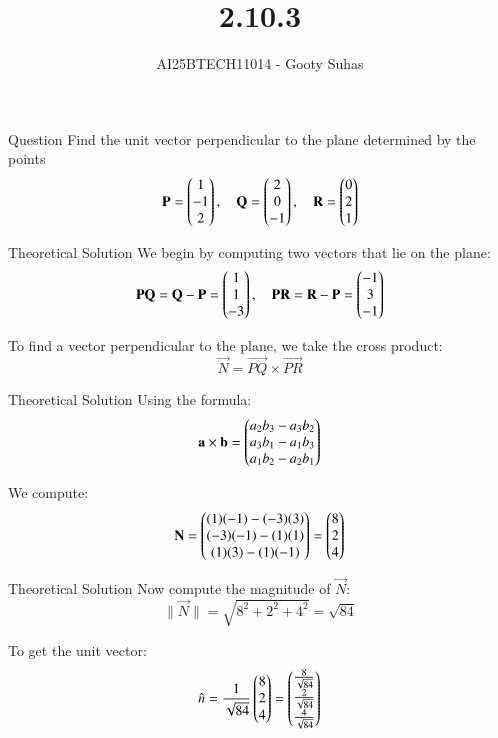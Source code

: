 \documentclass{beamer}
\title{2.10.3}
\author{AI25BTECH11014 - Gooty Suhas}
\begin{document}
\frame{\titlepage}

\begin{frame}{Question}
Find the unit vector perpendicular to the plane determined by the points
\[
\mathbf{P} = \begin{pmatrix}1 \\ -1 \\ 2\end{pmatrix}, \quad
\mathbf{Q} = \begin{pmatrix}2 \\ 0 \\ -1\end{pmatrix}, \quad
\mathbf{R} = \begin{pmatrix}0 \\ 2 \\ 1\end{pmatrix}
\]
\end{frame}

\begin{frame}{Theoretical Solution}
We begin by computing two vectors that lie on the plane:
\[
\mathbf{PQ} = \mathbf{Q} - \mathbf{P} = \begin{pmatrix}1 \\ 1 \\ -3\end{pmatrix}, \quad
\mathbf{PR} = \mathbf{R} - \mathbf{P} = \begin{pmatrix}-1 \\ 3 \\ -1\end{pmatrix}
\]

To find a vector perpendicular to the plane, we take the cross product:
\[
\vec{N} = \vec{PQ} \times \vec{PR}
\]
\end{frame}

\begin{frame}{Theoretical Solution}
Using the formula:
\[
\mathbf{a} \times \mathbf{b} = \begin{pmatrix}
a_2 b_3 - a_3 b_2 \\
a_3 b_1 - a_1 b_3 \\
a_1 b_2 - a_2 b_1
\end{pmatrix}
\]

We compute:
\[
\mathbf{N} = \begin{pmatrix}
(1)(-1) - (-3)(3) \\
(-3)(-1) - (1)(1) \\
(1)(3) - (1)(-1)
\end{pmatrix} = \begin{pmatrix}8 \\ 2 \\ 4\end{pmatrix}
\]
\end{frame}

\begin{frame}{Theoretical Solution}
Now compute the magnitude of \( \vec{N} \):
\[
\|\vec{N}\| = \sqrt{8^2 + 2^2 + 4^2} = \sqrt{84}
\]

To get the unit vector:
\[
\hat{n} = \frac{1}{\sqrt{84}} \begin{pmatrix}8 \\ 2 \\ 4\end{pmatrix}
= \begin{pmatrix}\frac{8}{\sqrt{84}} \\ \frac{2}{\sqrt{84}} \\ \frac{4}{\sqrt{84}}\end{pmatrix}
\]
\end{frame}
\end{document}
